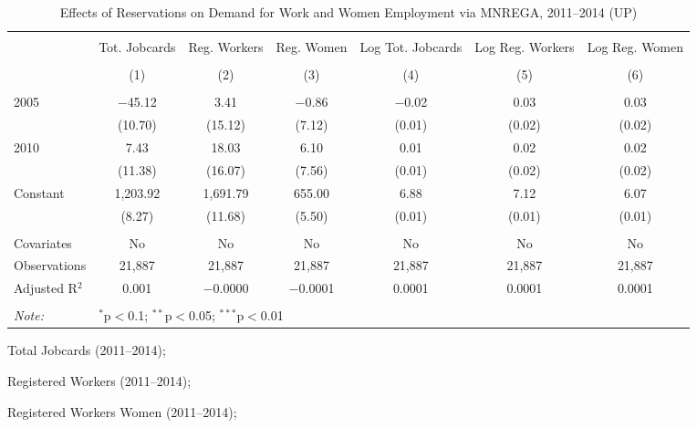 \begin{sidewaystable}[!htbp]
\centering
\begin{threeparttable}

  \caption{Effects of Reservations on Demand for Work and Women Employment via MNREGA, 2011--2014 (UP)} 
  \label{mnrega_main_up} 
\scriptsize 
\begin{tabular}{@{\extracolsep{0pt}}lcccccc} 
\\[-1.8ex]\hline 
\hline \\[-1.8ex] 
 & Tot. Jobcards & Reg. Workers & Reg. Women & Log Tot. Jobcards & Log Reg. Workers & Log Reg. Women \\ 
\\[-1.8ex] & (1) & (2) & (3) & (4) & (5) & (6)\\ 
\hline \\[-1.8ex] 
 2005 & $-$45.12 & 3.41 & $-$0.86 & $-$0.02 & 0.03 & 0.03 \\ 
  & (10.70) & (15.12) & (7.12) & (0.01) & (0.02) & (0.02) \\ 
  2010 & 7.43 & 18.03 & 6.10 & 0.01 & 0.02 & 0.02 \\ 
  & (11.38) & (16.07) & (7.56) & (0.01) & (0.02) & (0.02) \\ 
  Constant & 1,203.92 & 1,691.79 & 655.00 & 6.88 & 7.12 & 6.07 \\ 
  & (8.27) & (11.68) & (5.50) & (0.01) & (0.01) & (0.01) \\ 
 \hline \\[-1.8ex] 
Covariates & No & No & No & No & No & No \\ 
Observations & 21,887 & 21,887 & 21,887 & 21,887 & 21,887 & 21,887 \\ 
Adjusted R$^{2}$ & 0.001 & $-$0.0000 & $-$0.0001 & 0.0001 & 0.0001 & 0.0001 \\ 
\hline 
\hline \\[-1.8ex] 
\textit{Note:}  & \multicolumn{6}{l}{$^{*}$p$<$0.1; $^{**}$p$<$0.05; $^{***}$p$<$0.01} \\ 
\end{tabular} 
\begin{tablenotes}[flushleft]
\setlength{\itemindent}{0em}
\scriptsize
\item Total Jobcards (2011--2014);
\item Registered Workers (2011--2014);
\item Registered Workers Women  (2011--2014);
\end{tablenotes}
\end{threeparttable}
\end{sidewaystable}
